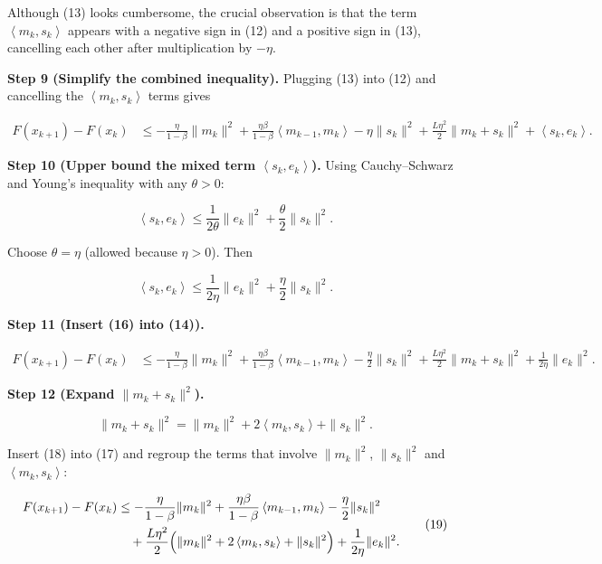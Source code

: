 \documentclass{article}
\newcommand{\inner}[2]{\left\langle #1,#2\right\rangle}
\begin{document}
Although (13) looks cumbersome, the crucial observation is that the term $\inner{m_{k}}{s_{k}}$ appears with a negative sign in (12) and a positive sign in (13), cancelling each other after multiplication by $-\eta$.

\noindent\textbf{Step 9 (Simplify the combined inequality).}  
Plugging (13) into (12) and cancelling the $\inner{m_{k}}{s_{k}}$ terms gives  

\[
\begin{aligned}
F(x_{k+1})-F(x_{k})
&\le -\frac{\eta}{1-\beta}\|m_{k}\|^{2}
   +\frac{\eta\beta}{1-\beta}\inner{m_{k-1}}{m_{k}}
   -\eta\|s_{k}\|^{2}
   +\frac{L\eta^{2}}{2}\|m_{k}+s_{k}\|^{2}
   +\inner{s_{k}}{e_{k}} .
\end{aligned}
\tag{14}
\]

\noindent\textbf{Step 10 (Upper bound the mixed term $\inner{s_{k}}{e_{k}}$).}  
Using Cauchy–Schwarz and Young’s inequality with any $\theta>0$:

\[
\inner{s_{k}}{e_{k}}\le \frac{1}{2\theta}\|e_{k}\|^{2}+\frac{\theta}{2}\|s_{k}\|^{2}. \tag{15}
\]

Choose $\theta=\eta$ (allowed because $\eta>0$). Then  

\[
\inner{s_{k}}{e_{k}}\le \frac{1}{2\eta}\|e_{k}\|^{2}+\frac{\eta}{2}\|s_{k}\|^{2}. \tag{16}
\]

\noindent\textbf{Step 11 (Insert (16) into (14)).}  

\[
\begin{aligned}
F(x_{k+1})-F(x_{k})
&\le -\frac{\eta}{1-\beta}\|m_{k}\|^{2}
   +\frac{\eta\beta}{1-\beta}\inner{m_{k-1}}{m_{k}}
   -\frac{\eta}{2}\|s_{k}\|^{2}
   +\frac{L\eta^{2}}{2}\|m_{k}+s_{k}\|^{2}
   +\frac{1}{2\eta}\|e_{k}\|^{2}.
\end{aligned}
\tag{17}
\]

\noindent\textbf{Step 12 (Expand $\|m_{k}+s_{k}\|^{2}$).}  

\[
\|m_{k}+s_{k}\|^{2}= \|m_{k}\|^{2}+2\inner{m_{k}}{s_{k}}+\|s_{k}\|^{2}.
\tag{18}
\]

Insert (18) into (17) and regroup the terms that involve $\|m_{k}\|^{2}$, $\|s_{k}\|^{2}$ and $\inner{m_{k}}{s_{k}}$:

\[
\begin{aligned}
F(x_{k+1})-F(x_{k})
&\le -\frac{\eta}{1-\beta}\|m_{k}\|^{2}
   +\frac{\eta\beta}{1-\beta}\inner{m_{k-1}}{m_{k}}
   -\frac{\eta}{2}\|s_{k}\|^{2}\\
&\quad +\frac{L\eta^{2}}{2}\Bigl(\|m_{k}\|^{2}+2\inner{m_{k}}{s_{k}}+\|s_{k}\|^{2}\Bigr)
   +\frac{1}{2\eta}\|e_{k}\|^{2}.
\end{aligned}
\tag{19}
\]
\end{document}
